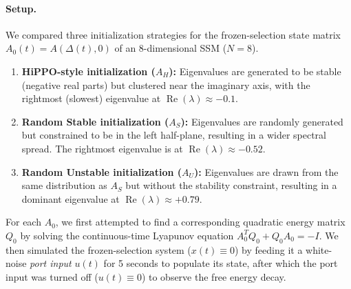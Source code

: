 \documentclass[10pt]{article} %
\DeclareMathOperator{\realPart}{Re}                     %
\theoremstyle{definition}
\begin{document}
\paragraph{Setup.}
We compared three initialization strategies for the frozen-selection state matrix $A_0(t)=A(\Delta(t),0)$ of an 8-dimensional SSM ($N=8$).
\begin{enumerate}
    \item \textbf{HiPPO-style initialization ($A_H$):} Eigenvalues are generated to be stable (negative real parts) but clustered near the imaginary axis, with the rightmost (slowest) eigenvalue at $\realPart(\lambda) \approx -0.1$.
    \item \textbf{Random Stable initialization ($A_S$):} Eigenvalues are randomly generated but constrained to be in the left half-plane, resulting in a wider spectral spread. The rightmost eigenvalue is at $\realPart(\lambda) \approx -0.52$.
    \item \textbf{Random Unstable initialization ($A_U$):} Eigenvalues are drawn from the same distribution as $A_S$ but without the stability constraint, resulting in a dominant eigenvalue at $\realPart(\lambda) \approx +0.79$.
\end{enumerate}
For each $A_0$, we first attempted to find a corresponding quadratic energy matrix $Q_0$ by solving the continuous-time Lyapunov equation $A_0^T Q_0 + Q_0 A_0 = -I$. We then simulated the frozen-selection system ($x(t)\equiv 0$) by feeding it a white-noise \emph{port input} $u(t)$ for 5 seconds to populate its state, after which the port input was turned off ($u(t)\equiv 0$) to observe the free energy decay.
\end{document}

